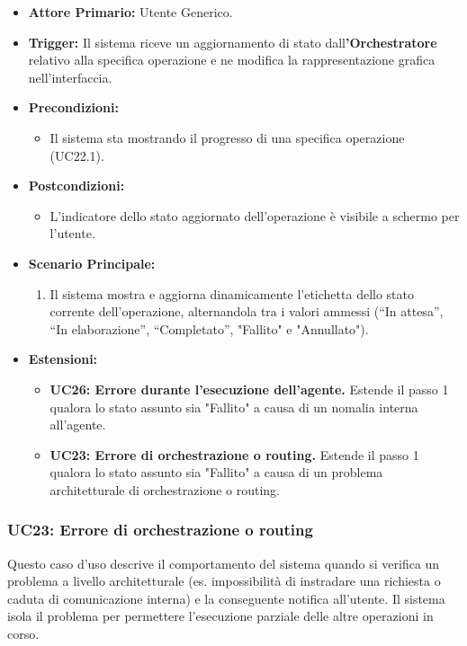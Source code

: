 \documentclass[12pt, a4paper]{article}
\begin{document}
\begin{itemize}
    \item \textbf{Attore Primario:} Utente Generico.
    \item \textbf{Trigger:} Il sistema riceve un aggiornamento di stato dall\textbf{'Orchestratore} relativo alla specifica operazione e ne modifica la rappresentazione grafica nell'interfaccia.
    \item \textbf{Precondizioni:}
    \begin{itemize}
        \item Il sistema sta mostrando il progresso di una specifica operazione (UC22.1).
    \end{itemize}
    \item \textbf{Postcondizioni:}
    \begin{itemize}
        \item L'indicatore dello stato aggiornato dell'operazione è visibile a schermo per l'utente.
    \end{itemize}
    \item \textbf{Scenario Principale:}
    \begin{enumerate}
        \item Il sistema mostra e aggiorna dinamicamente l'etichetta dello stato corrente dell'operazione, alternandola tra i valori ammessi (``In attesa'', ``In elaborazione'', ``Completato'', "Fallito" e "Annullato").
    \end{enumerate}
    \item \textbf{Estensioni:}
    \begin{itemize}
        \item \textbf{UC26: Errore durante l'esecuzione dell'agente.} Estende il passo 1 qualora lo stato assunto sia "Fallito" a causa di un nomalia interna all'agente.
        \item \textbf{UC23: Errore di orchestrazione o routing.} Estende il passo 1 qualora lo stato assunto sia "Fallito" a causa di un problema architetturale di orchestrazione o routing.
    \end{itemize}
\end{itemize}


\subsubsection{UC23: Errore di orchestrazione o routing}\label{uc:23}
Questo caso d'uso descrive il comportamento del sistema quando si verifica un problema a livello architetturale (es. impossibilità di instradare una richiesta o caduta di comunicazione interna) e la conseguente notifica all'utente. Il sistema isola il problema per permettere l'esecuzione parziale delle altre operazioni in corso.
\end{document}
